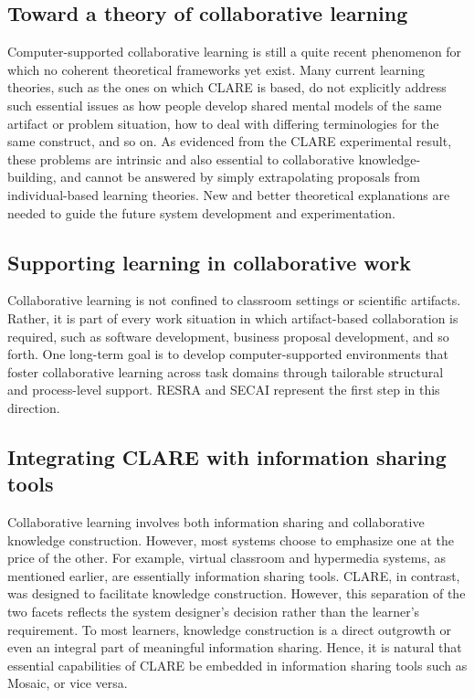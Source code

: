 \subsection{Toward a theory of collaborative learning}

Computer-supported collaborative learning is still a quite recent
phenomenon for which no coherent theoretical frameworks yet exist. Many
current learning theories, such as the ones on which CLARE is based, do not
explicitly address such essential issues as how people develop shared
mental models of the same artifact or problem situation, how to deal with
differing terminologies for the same construct, and so on. As evidenced
from the CLARE experimental result, these problems are intrinsic and also
essential to collaborative knowledge-building, and cannot be answered by
simply extrapolating proposals from individual-based learning
theories. New and better theoretical explanations are needed to guide the
future system development and experimentation. 


\subsection{Supporting learning in collaborative work}

Collaborative learning is not confined to classroom settings or scientific
artifacts. Rather, it is part of every work situation in which
artifact-based collaboration is required, such as software development,
business proposal development, and so forth. One long-term goal is to
develop computer-supported environments that foster collaborative learning
across task domains through tailorable structural and process-level
support. RESRA and SECAI represent the first step in this direction.


\subsection{Integrating CLARE with information sharing tools}

Collaborative learning involves both information sharing and collaborative
knowledge construction. However, most systems choose to emphasize one at
the price of the other. For example, virtual classroom and hypermedia
systems, as mentioned earlier, are essentially information sharing
tools. CLARE, in contrast, was designed to facilitate knowledge
construction. However, this separation of the two facets reflects the
system designer's decision rather than the learner's requirement. To most
learners, knowledge construction is a direct outgrowth or even an integral
part of meaningful information sharing. Hence, it is natural that essential
capabilities of CLARE be embedded in information sharing tools such as
Mosaic, or vice versa.



